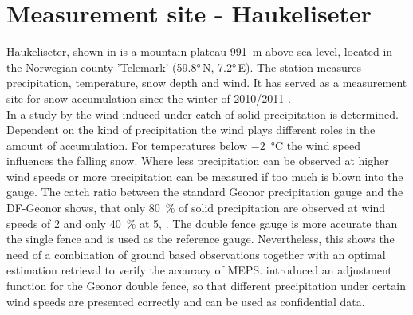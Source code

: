 \section{Measurement site - Haukeliseter}
\label{sec:site}

Haukeliseter, shown in  is a mountain plateau \SI{991}{\m} above sea level, located in the Norwegian county 'Telemark' (\ang{59.8}\,N, \ang{7.2}\,E). The station measures precipitation, temperature, snow depth and wind. It has served as a measurement site for snow accumulation since the winter of 2010/2011 \citep{wolff_new_2010, wolff_measurements_2013, wolff_derivation_2015}. 
\\
In a study by \cite{wolff_derivation_2015} the wind-induced under-catch of solid precipitation is determined. Dependent on the kind of precipitation the wind plays different roles in the amount of accumulation. For temperatures below \SI{-2}{\celsius} the wind speed influences the falling snow. Where less precipitation can be observed at higher wind speeds or more precipitation can be measured if too much is blown into the gauge. The catch ratio between the standard Geonor precipitation gauge and the DF-Geonor shows, that only \SI{80}{\percent} of solid precipitation are observed at wind speeds of \SI{2}{\mPs} and only \SI{40}{\percent} at \SI{5}{\mPs}, \cite[Figure 5 in][]{wolff_derivation_2015}. The double fence gauge is more accurate than the single fence and is used as the reference gauge.
Nevertheless, this shows the need of a combination of ground based observations together with an optimal estimation retrieval to verify the accuracy of MEPS. \cite{wolff_derivation_2015} introduced an adjustment function for the Geonor double fence, so that different precipitation under certain wind speeds are presented correctly and can be used as confidential data. 